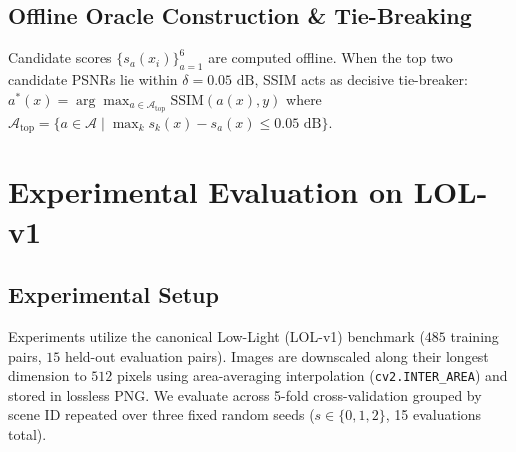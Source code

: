\documentclass[journal]{IEEEtran}
\begin{document}
\begin{table}[!t]
\centering
\caption{The 8-Dimensional Degradation Feature Vector $\phi(x)$}
\label{tab:features}
\end{table}

\subsection{Offline Oracle Construction \& Tie-Breaking}
Candidate scores $\{s_a(x_i)\}_{a=1}^6$ are computed offline. When the top two candidate PSNRs lie within $\delta = 0.05\text{ dB}$, SSIM acts as decisive tie-breaker: $a^*(x) = \arg\max_{a \in \mathcal{A}_{\text{top}}} \text{SSIM}(a(x), y)$ where $\mathcal{A}_{\text{top}} = \{a \in \mathcal{A} \mid \max_k s_k(x) - s_a(x) \le 0.05\text{ dB}\}$.

\section{Experimental Evaluation on LOL-v1}

\subsection{Experimental Setup}
Experiments utilize the canonical Low-Light (LOL-v1) benchmark \cite{wei2018deep} ($485$ training pairs, $15$ held-out evaluation pairs). Images are downscaled along their longest dimension to $512$ pixels using area-averaging interpolation (\texttt{cv2.INTER\_AREA}) and stored in lossless PNG. We evaluate across 5-fold cross-validation grouped by scene ID repeated over three fixed random seeds ($s \in \{0, 1, 2\}$, 15 evaluations total).
\end{document}
